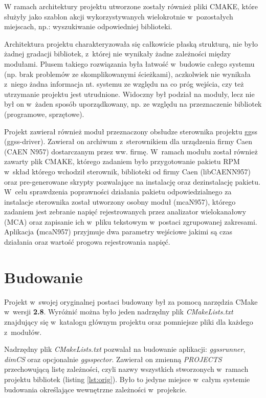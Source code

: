 W ramach architektury projektu utworzone zostały również pliki CMAKE, które służyły jako szablon akcji wykorzystywanych wielokrotnie w~pozostałych miejscach, np.: wyszukiwanie odpowiedniej biblioteki.\par 
Architektura projektu charakteryzowała się całkowicie płaską strukturą, nie było żadnej gradacji bibliotek, z~której nie wynikały żadne zależności między modułami. Plusem takiego rozwiązania była łatwość w~budowie całego systemu (np. brak problemów ze skomplikowanymi ścieżkami), aczkolwiek nie wynikała z~niego żadna informacja nt. systemu ze względu na co próg wejścia, czy też utrzymanie projektu jest utrudnione. Widoczny był podział na moduły, lecz nie był on w~żaden sposób uporządkowany, np. ze względu na przeznaczenie bibliotek (programowe, sprzętowe). 

\par Projekt zawierał również moduł przeznaczony obsłudze sterownika projektu ggss (ggss-driver). Zawierał on archiwum z~sterownikiem dla urządzenia firmy Caen (CAEN N957) dostarczanym przez ww. firmę. W~ramach modułu został również zawarty plik CMAKE, którego zadaniem było przygotowanie pakietu RPM w~skład którego wchodził sterownik, biblioteki od firmy Caen (libCAENN957) oraz pre-generowane skrypty pozwalające na instalację oraz dezinstalację pakietu. W~celu sprawdzenia poprawności działania pakietu odpowiedzialnego za instalacje sterownika został utworzony osobny moduł (mcaN957), którego zadaniem jest zebranie napięć rejestrowanych przez analizator wielokanałowy (MCA) oraz zapisanie ich w~pliku tekstowym w~postaci zgrupowanej zakresami. Aplikacja \textbf(mcaN957) przyjmuje dwa parametry wejściowe jakimi są czas działania oraz wartość progowa rejestrowania napięć.


\section{Budowanie} 
Projekt w~swojej oryginalnej postaci budowany był za pomocą narzędzia CMake w~wersji \textbf{2.8}. Wyróżnić można było jeden nadrzędny plik \textit{CMakeLists.txt} znajdujący się w~katalogu głównym projektu oraz pomniejsze pliki dla każdego z~modułów.

Nadrzędny plik \textit{CMakeLists.txt} pozwalał na budowanie aplikacji: \textit{ggssrunner}, \textit{dimCS} oraz opcjonalnie \textit{ggsspector}. Zawierał on zmienną \textit{PROJECTS} przechowującą listę zależności, czyli nazwy wszystkich stworzonych w~ramach projektu bibliotek (listing \ref{lst:orig}). Było to jedyne miejsce w~całym systemie budowania określające wewnętrzne zależności w~projekcie.

